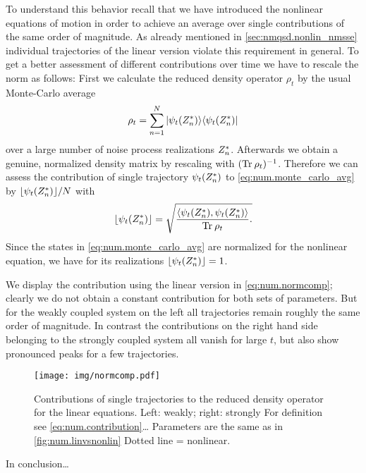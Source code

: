 To understand this behavior recall that we have introduced the nonlinear equations of motion in order to achieve an average over single contributions of the same order of magnitude.
As already mentioned in \autoref{sec:nmqsd.nonlin_nmsse} individual trajectories of the linear version violate this requirement in general.
To get a better assessment of different contributions over time we have to rescale the norm as follows:
First we calculate the reduced density operator $\rho_t$ by the usual Monte-Carlo average
\begin{equation}
  \rho_t = \sum_{n=1}^N | \psi_t({Z}^*_n) \rangle \langle \psi_t({Z}^*_n) |
  \label{eq:num.monte_carlo_avg}
\end{equation}
over a large number of noise process realizations ${Z}^*_n$.
Afterwards we obtain a genuine, normalized density matrix by rescaling with $(\operatorname{Tr}_\mathrm{} \rho_t)^{-1}$.
Therefore we can assess the contribution of single trajectory $\psi_t({Z}^*_n)$ to \autoref{eq:num.monte_carlo_avg} by $\lfloor \psi_t({Z}^*_n) \rfloor / N$ with
\begin{equation}
  \lfloor \psi_t(\ZZ_n) \rfloor = \sqrt{%
    \frac{\sp{\psi_t(\ZZ_n)}{\psi_t(\ZZ_n)}}{\Tr{} \rho_t}.
  }
  \label{eq:num.contribution}
\end{equation}
Since the states in \autoref{eq:num.monte_carlo_avg} are normalized for the nonlinear equation, we have for its realizations $\lfloor\psi_t({Z}^*_n)\rfloor = 1$.

We display the contribution using the linear version in \autoref{eq:num.normcomp}; clearly we do not obtain a constant contribution for both sets of parameters.
But for the weakly coupled system on the left all trajectories remain roughly the same order of magnitude.
In contrast the contributions on the right hand side belonging to the strongly coupled system all vanish for large $t$, but also show pronounced peaks for a few trajectories.

\begin{figure}[t]
  \centering
  \texttt{[image: img/normcomp.pdf]}
  \caption{%
    Contributions of single trajectories to the reduced density operator for the linear equations.
    Left: weakly; right: strongly
    For definition see \autoref{eq:num.contribution}\dots
    Parameters are the same as in \autoref{fig:num.linvsnonlin}
    Dotted line = nonlinear.
  }
  \label{fig:num.normcomp}
\end{figure}

In conclusion\dots

